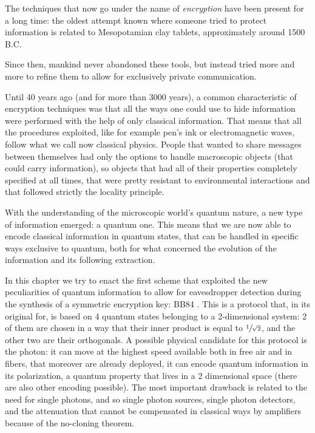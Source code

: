 The techniques that now go under the name of \textit{encryption} have
been present for a long time: the oldest attempt
known where someone tried to protect information is related to
Mesopotamian clay tablets,
approximately around 1500 B.C.

Since then, mankind never abandoned these tools, but instead
tried more and more to refine them to allow for exclusively private
communication.

Until 40 years ago (and for more than 3000 years), a common
characteristic of encryption techniques was that
all the ways one could use to hide information were performed with the
help of only classical information.
That means that all the procedures exploited, like for example pen's
ink or electromagnetic
waves, follow what we call now classical physics.
People that wanted
to share messages between themselves had only the options to
handle macroscopic objects (that could carry information),
so objects that had all of their properties completely specified at all times,
that were pretty resistant to environmental interactions and that
followed strictly
the locality principle.

With the understanding of the microscopic world's quantum nature, a new type of
information emerged: a quantum one. This means that we are now able to encode
classical information in quantum states, that can be handled in
specific ways exclusive
to quantum, both for what concerned the evolution of the information
and its following
extraction.

In this chapter we try to enact the first scheme that exploited the new
peculiarities of quantum information to allow for eavesdropper
detection during the synthesis of a symmetric encryption key: BB84
\cite{Bennett_2014}.
This is a protocol that, in its original for, is based on 4 quantum
states belonging to a 2-dimensional system: 2 of them are chosen in a
way that their
inner product is equal to $ \sfrac{1}{\sqrt{2}}$, and the other two
are their orthogonals.
A possible physical candidate for this protocol is the photon: it can
move at the highest speed available both in free
air and in fibers, that moreover are already deployed, it can encode
quantum information in its polarization, a quantum property that
lives in a 2 dimensional space (there are also other encoding possible).
The most important drawback is related to the need for single photons, and so
single photon sources, single photon detectors, and the attenuation
that cannot be
compensated in classical ways by amplifiers because of the no-cloning theorem.


